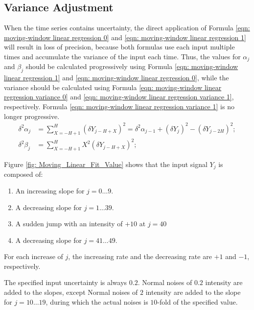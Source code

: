 \documentclass[twoside]{article}
\numberwithin{equation}{section}
\begin{document}
\subsection{Variance Adjustment} 

When the time series contains uncertainty, the direct application of Formula \eqref{eqn: moving-window linear regression 0} and \eqref{eqn: moving-window linear regression 1} will result in loss of precision, because both formulas use each input multiple times and accumulate the variance of the input each time.
Thus, the values for $\alpha_j$ and $\beta_j$ should be calculated progressively using Formula \eqref{eqn: moving-window linear regression 1} and \eqref{eqn: moving-window linear regression 0}, while the variance should be calculated using Formula \eqref{eqn: moving-window linear regression variance 0} and \eqref{eqn: moving-window linear regression variance 1}, respectively.
Formula \eqref{eqn: moving-window linear regression variance 1} is no longer progressive.
\begin{align}
\label{eqn: moving-window linear regression variance 0}
\delta^2 \alpha_{j} &= \sum_{X=-H+1}^{H} (\delta Y_{j-H+X})^2 = \delta^2 \alpha_{j-1} + (\delta Y_{j})^2 - (\delta Y_{j-2H})^2; \\
\label{eqn: moving-window linear regression variance 1}
\delta^2 \beta_{j} &= \sum_{X=-H+1}^{H} X^2 (\delta Y_{j-H+X})^2;
\end{align}

Figure \ref{fig: Moving_Linear_Fit_Value} shows that the input signal $Y_j$ is composed of:
\begin{enumerate}
\item An increasing slope for $j = 0 \dots 9$.

\item A decreasing slope for $j = 1 \dots 39$.

\item A sudden jump with an intensity of $+10$ at $j=40$

\item A decreasing slope for $j = 41 \dots 49$.
\end{enumerate}
For each increase of $j$, the increasing rate and the decreasing rate are $+1$ and $-1$, respectively.

The specified input uncertainty is always $0.2$.
Normal noises of $0.2$ intensity are added to the slopes, except Normal noises of $2$ intensity are added to the slope for $j = 10 \dots 19$, during which the actual noises is $10$-fold of the specified value.
\end{document}
